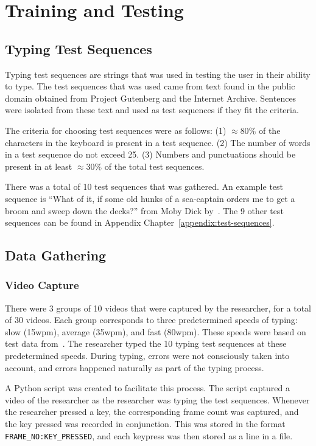 \documentclass{report}
\begin{document}
\section{Training and Testing}

\subsection{Typing Test Sequences}
Typing test sequences are strings that was used in testing the user in their
ability to type. The test sequences that was used came from text found in the
public domain obtained from Project Gutenberg and the Internet Archive.
Sentences were isolated from these text and used as test sequences if they fit
the criteria.

The criteria for choosing test sequences were as follows: (1) $\approx80\%$ of the
characters in the keyboard is present in a test sequence. (2) The number of
words in a test sequence do not exceed 25. (3) Numbers and punctuations should
be present in at least $\approx30\%$ of the total test sequences.

There was a total of 10 test sequences that was gathered. An example test
sequence is ``What of it, if some old hunks of a sea-captain orders me to get a
broom and sweep down the decks?'' from Moby Dick by~\cite{moby-dick}. The 9
other test sequences can be found in Appendix
Chapter~\ref{appendix:test-sequences}.

\subsection{Data Gathering}
\subsubsection{Video Capture}
There were 3 groups of 10 videos that were captured by the researcher, for a
total of 30 videos. Each group corresponds to three predetermined speeds of
typing: slow (15wpm), average (35wpm), and fast (80wpm). These speeds were based
on test data from~\cite{keybr}. The researcher typed the 10 typing test
sequences at these predetermined speeds. During typing, errors were not
consciously taken into account, and errors happened naturally as part of the
typing process.

A Python script was created to facilitate this process. The script captured a
video of the researcher as the researcher was typing the test sequences.
Whenever the researcher pressed a key, the corresponding frame count was
captured, and the key pressed was recorded in conjunction. This was stored in
the format \texttt{FRAME\_NO:KEY\_PRESSED}, and each keypress was then stored as
a line in a file.
\end{document}
